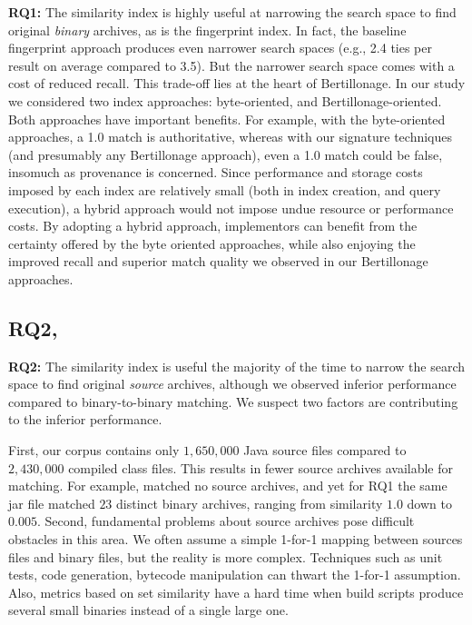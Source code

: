 \textbf{RQ1:}
The similarity index is highly useful at narrowing the search space to find
original \emph{binary} archives, as is the fingerprint index.  In fact, the
baseline fingerprint approach produces even narrower search spaces (e.g., 2.4 ties per
result on average compared to 3.5).  But the narrower search space comes
with a cost of reduced recall.  This trade-off lies at the heart of
Bertillonage.  In our study we considered two index approaches:
byte-oriented, and Bertillonage-oriented.  Both approaches have important
benefits.  For example, with the byte-oriented approaches, a 1.0 match is
authoritative, whereas with our signature techniques (and presumably any
Bertillonage approach), even a 1.0 match could be false, insomuch as
provenance is concerned.  Since performance and storage costs imposed by
each index are relatively small (both in index creation, and query
execution), a hybrid approach would not impose undue resource or performance costs.
By adopting a hybrid approach, implementors can benefit from the
certainty offered by the byte oriented approaches, while also enjoying the
improved recall and superior match quality we observed in our Bertillonage approaches.


\subsection{RQ2, \rqTwo}

\textbf{RQ2:}
The similarity index is useful the majority of the time to narrow the
search space to find original \emph{source} archives, although we observed
inferior performance compared to binary-to-binary matching.  We suspect two
factors are contributing to the inferior performance.


First, our corpus contains only $1,650,000$ Java source files
compared to $2,430,000$ compiled class files.  This results in fewer
source archives available for matching.  For example,
 matched no source archives, and yet for RQ1 the
same jar file matched $23$ distinct binary archives, ranging from
similarity $1.0$ down to $0.005$.  Second, fundamental problems about
source archives pose difficult obstacles in this area.  We often assume a
simple 1-for-1 mapping between sources files and binary files, but the
reality is more complex.  Techniques such as unit tests, code generation,
bytecode manipulation can thwart the 1-for-1 assumption.  Also, metrics
based on set similarity have a hard time when build scripts produce several
small binaries instead of a single large one.

